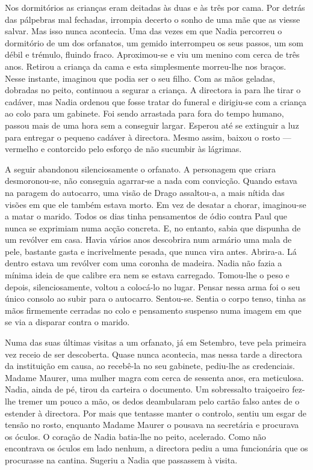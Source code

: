 Nos dormitórios as crianças eram deitadas às duas e às três por cama.
Por detrás das pálpebras mal fechadas, irrompia decerto o sonho de uma
mãe que as viesse salvar. Mas isso nunca acontecia. Uma das vezes em que
Nadia percorreu o dormitório de um dos orfanatos, um gemido interrompeu
os seus passos, um som débil e trémulo, fluindo fraco. Aproximou-se e
viu um menino com cerca de três anos. Retirou a criança da cama e esta
simplesmente morreu-lhe nos braços. Nesse instante, imaginou que podia
ser o seu filho. Com as mãos geladas, dobradas no peito, continuou a
segurar a criança. A directora ia para lhe tirar o cadáver, mas Nadia
ordenou que fosse tratar do funeral e dirigiu-se com a criança ao colo
para um gabinete. Foi sendo arrastada para fora do tempo humano,
passou mais de uma hora sem a conseguir largar. Esperou até se extinguir
a luz para entregar o pequeno cadáver à directora. Mesmo assim, baixou o
rosto --- vermelho e contorcido pelo esforço de não sucumbir às lágrimas.

A seguir abandonou silenciosamente o orfanato. A personagem que criara desmoronou-se, não conseguia agarrar-se a nada com
convicção. Quando estava na paragem do autocarro, uma visão de Drago
assaltou-a, a mais
nítida das visões em que ele também estava morto. Em vez de desatar a
chorar, imaginou-se a matar o marido. Todos os dias tinha pensamentos de
ódio contra Paul que nunca se exprimiam numa acção concreta. E, no
entanto, sabia que dispunha de um revólver em casa. Havia vários anos
descobrira num armário uma mala de pele, bastante gasta e incrivelmente
pesada, que nunca vira antes. Abrira-a. Lá dentro estava um revólver com
uma coronha de madeira. Nadia não fazia a mínima ideia de que calibre
era nem se estava carregado. Tomou-lhe o peso e depois, silenciosamente, voltou a colocá-lo no lugar. Pensar nessa arma foi o seu único
consolo ao subir para o autocarro. Sentou-se. Sentia o corpo tenso,
tinha as mãos firmemente cerradas no colo e pensamento suspenso numa
imagem em que se via a disparar contra o marido.

Numa das suas últimas visitas a um orfanato, já em
Setembro, teve pela primeira vez receio de ser descoberta. Quase nunca
acontecia, mas nessa tarde a directora da instituição em causa, ao
recebê-la no seu gabinete, pediu-lhe as credenciais. Madame Maurer, uma
mulher magra com cerca de sessenta anos, era meticulosa. Nadia, ainda de
pé, tirou da carteira o documento. Um sobressalto traiçoeiro fez-lhe
tremer um pouco a mão, os dedos deambularam pelo cartão falso antes de o
estender à directora. Por mais que tentasse manter o controlo, sentiu um
esgar de tensão no rosto, enquanto Madame Maurer o pousava na secretária e procurava os óculos. O coração de Nadia batia-lhe no peito,
acelerado. Como não encontrava os óculos em lado nenhum, a directora
pediu a uma funcionária que os procurasse na cantina. Sugeriu a Nadia
que passassem à visita.

